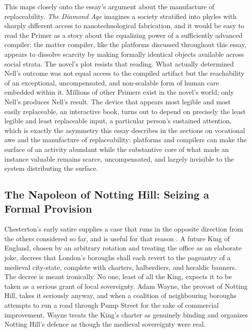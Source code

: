 \documentclass[11pt]{article}
\begin{document}
This maps closely onto the essay's argument about the manufacture of replaceability. \emph{The Diamond Age} imagines a society stratified into phyles with sharply different access to nanotechnological fabrication, and it would be easy to read the Primer as a story about the equalizing power of a sufficiently advanced compiler: the matter compiler, like the platforms discussed throughout this essay, appears to dissolve scarcity by making formally identical objects available across social strata. The novel's plot resists that reading. What actually determined Nell's outcome was not equal access to the compiled artifact but the reachability of an exceptional, uncompensated, and non-scalable form of human care embedded within it. Millions of other Primers exist in the novel's world; only Nell's produces Nell's result. The device that appears most legible and most easily replaceable, an interactive book, turns out to depend on precisely the least legible and least replaceable input, a particular person's sustained attention, which is exactly the asymmetry this essay describes in the sections on vocational awe and the manufacture of replaceability: platforms and compilers can make the surface of an activity abundant while the substantive core of what made an instance valuable remains scarce, uncompensated, and largely invisible to the system distributing the surface.

\subsection{The Napoleon of Notting Hill: Seizing a Formal Provision}

Chesterton's early satire supplies a case that runs in the opposite direction from the others considered so far, and is useful for that reason \parencite{chesterton1904napoleon}. A future King of England, chosen by an arbitrary rotation and treating the office as an elaborate joke, decrees that London's boroughs shall each revert to the pageantry of a medieval city-state, complete with charters, halberdiers, and heraldic banners. The decree is meant ironically. No one, least of all the King, expects it to be taken as a serious grant of local sovereignty. Adam Wayne, the provost of Notting Hill, takes it seriously anyway, and when a coalition of neighbouring boroughs attempts to run a road through Pump Street for the sake of commercial improvement, Wayne treats the King's charter as genuinely binding and organizes Notting Hill's defence as though the medieval sovereignty were real.
\end{document}
